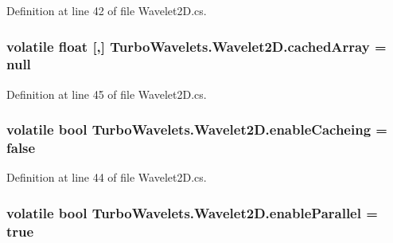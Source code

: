 \-Definition at line 42 of file \-Wavelet2\-D.\-cs.

\hypertarget{class_turbo_wavelets_1_1_wavelet2_d_a07949ac8b81d7afa1776e92f11b74834}{
\subsubsection[{cached\-Array}]{\setlength{\rightskip}{0pt plus 5cm}volatile float \mbox{[},\mbox{]} {\bf \-Turbo\-Wavelets.\-Wavelet2\-D.\-cached\-Array} = null}}\label{class_turbo_wavelets_1_1_wavelet2_d_a07949ac8b81d7afa1776e92f11b74834}


\-Definition at line 45 of file \-Wavelet2\-D.\-cs.

\hypertarget{class_turbo_wavelets_1_1_wavelet2_d_a2b5e1636f40bab5b6ee88f6e8bb1b653}{
\subsubsection[{enable\-Cacheing}]{\setlength{\rightskip}{0pt plus 5cm}volatile bool {\bf \-Turbo\-Wavelets.\-Wavelet2\-D.\-enable\-Cacheing} = false}}\label{class_turbo_wavelets_1_1_wavelet2_d_a2b5e1636f40bab5b6ee88f6e8bb1b653}


\-Definition at line 44 of file \-Wavelet2\-D.\-cs.

\hypertarget{class_turbo_wavelets_1_1_wavelet2_d_a742fff705da3ff5a4b6d67e9a56637be}{
\subsubsection[{enable\-Parallel}]{\setlength{\rightskip}{0pt plus 5cm}volatile bool {\bf \-Turbo\-Wavelets.\-Wavelet2\-D.\-enable\-Parallel} = true}}\label{class_turbo_wavelets_1_1_wavelet2_d_a742fff705da3ff5a4b6d67e9a56637be}


